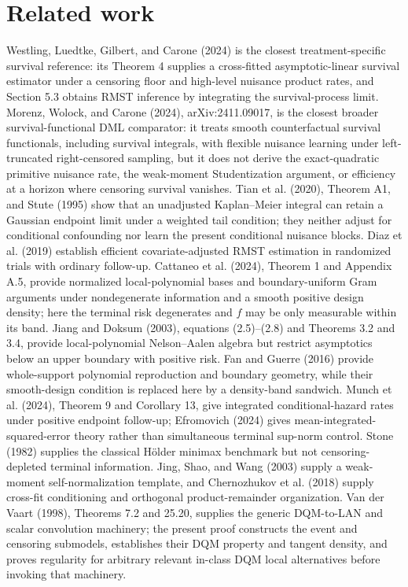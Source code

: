 \documentclass{article}
\begin{document}
\section{Related work}

Westling, Luedtke, Gilbert, and Carone (2024) is the closest treatment-specific survival reference: its Theorem 4 supplies a cross-fitted asymptotic-linear survival estimator under a censoring floor and high-level nuisance product rates, and Section 5.3 obtains RMST inference by integrating the survival-process limit. Morenz, Wolock, and Carone (2024), arXiv:2411.09017, is the closest broader survival-functional DML comparator: it treats smooth counterfactual survival functionals, including survival integrals, with flexible nuisance learning under left-truncated right-censored sampling, but it does not derive the exact-quadratic primitive nuisance rate, the weak-moment Studentization argument, or efficiency at a horizon where censoring survival vanishes. Tian et al. (2020), Theorem A1, and Stute (1995) show that an unadjusted Kaplan--Meier integral can retain a Gaussian endpoint limit under a weighted tail condition; they neither adjust for conditional confounding nor learn the present conditional nuisance blocks. Diaz et al. (2019) establish efficient covariate-adjusted RMST estimation in randomized trials with ordinary follow-up. Cattaneo et al. (2024), Theorem 1 and Appendix A.5, provide normalized local-polynomial bases and boundary-uniform Gram arguments under nondegenerate information and a smooth positive design density; here the terminal risk degenerates and \(f\) may be only measurable within its band. Jiang and Doksum (2003), equations (2.5)--(2.8) and Theorems 3.2 and 3.4, provide local-polynomial Nelson--Aalen algebra but restrict asymptotics below an upper boundary with positive risk. Fan and Guerre (2016) provide whole-support polynomial reproduction and boundary geometry, while their smooth-design condition is replaced here by a density-band sandwich. Munch et al. (2024), Theorem 9 and Corollary 13, give integrated conditional-hazard rates under positive endpoint follow-up; Efromovich (2024) gives mean-integrated-squared-error theory rather than simultaneous terminal sup-norm control. Stone (1982) supplies the classical H\"older minimax benchmark but not censoring-depleted terminal information. Jing, Shao, and Wang (2003) supply a weak-moment self-normalization template, and Chernozhukov et al. (2018) supply cross-fit conditioning and orthogonal product-remainder organization. Van der Vaart (1998), Theorems 7.2 and 25.20, supplies the generic DQM-to-LAN and scalar convolution machinery; the present proof constructs the event and censoring submodels, establishes their DQM property and tangent density, and proves regularity for arbitrary relevant in-class DQM local alternatives before invoking that machinery.
\end{document}
